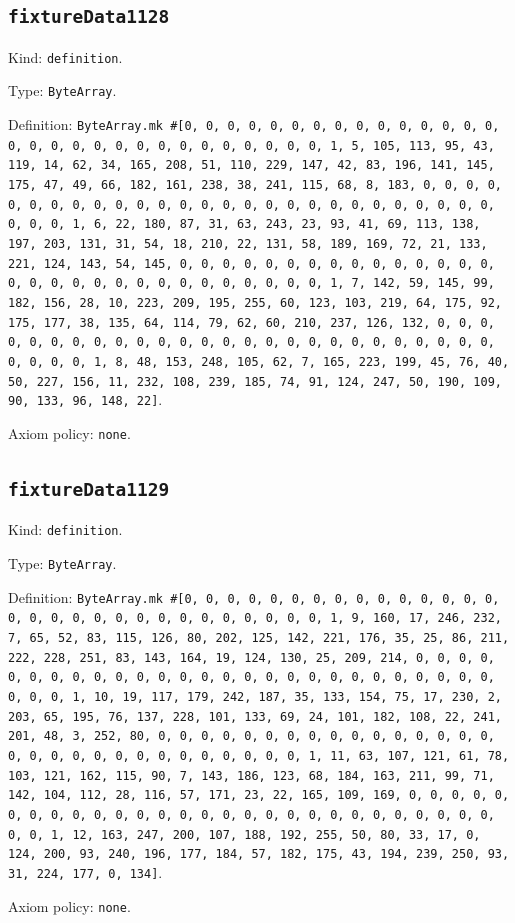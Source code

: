 \documentclass[11pt]{article}
\begin{document}
\subsection*{\texttt{fixtureData1128}}
\noindent Kind: \texttt{definition}.\par
\noindent Type: \texttt{ByteArray}.\par
\noindent Definition: \texttt{ByteArray.mk \#[0, 0, 0, 0, 0, 0, 0, 0, 0, 0, 0, 0, 0, 0, 0, 0, 0, 0, 0, 0, 0, 0, 0, 0, 0, 0, 0, 0, 0, 0, 1, 5, 105, 113, 95, 43, 119, 14, 62, 34, 165, 208, 51, 110, 229, 147, 42, 83, 196, 141, 145, 175, 47, 49, 66, 182, 161, 238, 38, 241, 115, 68, 8, 183, 0, 0, 0, 0, 0, 0, 0, 0, 0, 0, 0, 0, 0, 0, 0, 0, 0, 0, 0, 0, 0, 0, 0, 0, 0, 0, 0, 0, 0, 0, 1, 6, 22, 180, 87, 31, 63, 243, 23, 93, 41, 69, 113, 138, 197, 203, 131, 31, 54, 18, 210, 22, 131, 58, 189, 169, 72, 21, 133, 221, 124, 143, 54, 145, 0, 0, 0, 0, 0, 0, 0, 0, 0, 0, 0, 0, 0, 0, 0, 0, 0, 0, 0, 0, 0, 0, 0, 0, 0, 0, 0, 0, 0, 0, 1, 7, 142, 59, 145, 99, 182, 156, 28, 10, 223, 209, 195, 255, 60, 123, 103, 219, 64, 175, 92, 175, 177, 38, 135, 64, 114, 79, 62, 60, 210, 237, 126, 132, 0, 0, 0, 0, 0, 0, 0, 0, 0, 0, 0, 0, 0, 0, 0, 0, 0, 0, 0, 0, 0, 0, 0, 0, 0, 0, 0, 0, 0, 0, 1, 8, 48, 153, 248, 105, 62, 7, 165, 223, 199, 45, 76, 40, 50, 227, 156, 11, 232, 108, 239, 185, 74, 91, 124, 247, 50, 190, 109, 90, 133, 96, 148, 22]}.\par
\noindent Axiom policy: \texttt{none}.\par
\subsection*{\texttt{fixtureData1129}}
\noindent Kind: \texttt{definition}.\par
\noindent Type: \texttt{ByteArray}.\par
\noindent Definition: \texttt{ByteArray.mk \#[0, 0, 0, 0, 0, 0, 0, 0, 0, 0, 0, 0, 0, 0, 0, 0, 0, 0, 0, 0, 0, 0, 0, 0, 0, 0, 0, 0, 0, 0, 1, 9, 160, 17, 246, 232, 7, 65, 52, 83, 115, 126, 80, 202, 125, 142, 221, 176, 35, 25, 86, 211, 222, 228, 251, 83, 143, 164, 19, 124, 130, 25, 209, 214, 0, 0, 0, 0, 0, 0, 0, 0, 0, 0, 0, 0, 0, 0, 0, 0, 0, 0, 0, 0, 0, 0, 0, 0, 0, 0, 0, 0, 0, 0, 1, 10, 19, 117, 179, 242, 187, 35, 133, 154, 75, 17, 230, 2, 203, 65, 195, 76, 137, 228, 101, 133, 69, 24, 101, 182, 108, 22, 241, 201, 48, 3, 252, 80, 0, 0, 0, 0, 0, 0, 0, 0, 0, 0, 0, 0, 0, 0, 0, 0, 0, 0, 0, 0, 0, 0, 0, 0, 0, 0, 0, 0, 0, 0, 1, 11, 63, 107, 121, 61, 78, 103, 121, 162, 115, 90, 7, 143, 186, 123, 68, 184, 163, 211, 99, 71, 142, 104, 112, 28, 116, 57, 171, 23, 22, 165, 109, 169, 0, 0, 0, 0, 0, 0, 0, 0, 0, 0, 0, 0, 0, 0, 0, 0, 0, 0, 0, 0, 0, 0, 0, 0, 0, 0, 0, 0, 0, 0, 1, 12, 163, 247, 200, 107, 188, 192, 255, 50, 80, 33, 17, 0, 124, 200, 93, 240, 196, 177, 184, 57, 182, 175, 43, 194, 239, 250, 93, 31, 224, 177, 0, 134]}.\par
\noindent Axiom policy: \texttt{none}.\par
\end{document}
